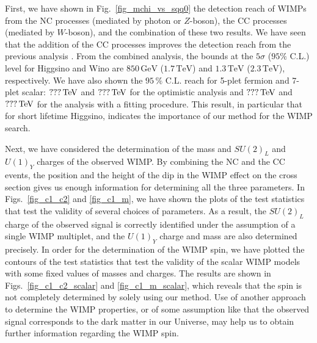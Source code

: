 \documentclass[12pt,twoside,book]{article}
\begin{document}
First, we have shown in Fig.~\ref{fig_mchi_vs_sqq0} the detection reach of WIMPs from the NC processes (mediated by photon or $Z$-boson), the CC processes (mediated by $W$-boson), and the combination of these two results.
We have seen that the addition of the CC processes improves the detection reach from the previous analysis \cite{Chigusa:2018vxz}.
From the combined analysis, the bounds at the $5\sigma$ ($95\%$ C.L.) level for Higgsino and Wino are $850\,\mathrm{GeV}$ ($1.7\,\mathrm{TeV}$) and $1.3\,\mathrm{TeV}$ ($2.3\,\mathrm{TeV}$), respectively.
We have also shown the $95\,\%$ C.L. reach for 5-plet fermion and 7-plet scalar: $???\,{\rm TeV}$ and $???\,{\rm TeV}$ for the optimistic analysis and $???\,{\rm TeV}$ and $???\,{\rm TeV}$ for the analysis with a fitting procedure.
This result, in particular that for short lifetime Higgsino, indicates the importance of our method for the WIMP search.

Next, we have considered the determination of the mass and $SU(2)_L$ and $U(1)_Y$ charges of the observed WIMP.
By combining the NC and the CC events, the position and the height of the dip in the WIMP effect on the cross section gives us enough information for determining all the three parameters.
In Figs.~\ref{fig_c1_c2} and \ref{fig_c1_m}, we have shown the plots of the test statistics that test the validity of several choices of parameters.
As a result, the $SU(2)_L$ charge of the observed signal is correctly identified under the assumption of a single WIMP multiplet, and the $U(1)_Y$ charge and mass are also determined precisely.
In order for the determination of the WIMP spin, we have plotted the contours of the test statistics that test the validity of the scalar WIMP models with some fixed values of masses and charges.
The results are shown in Figs.~\ref{fig_c1_c2_scalar} and \ref{fig_c1_m_scalar}, which reveals that the spin is not completely determined by solely using our method.
Use of another approach to determine the WIMP properties, or of some assumption like that the observed signal corresponds to the dark matter in our Universe, may help us to obtain further information regarding the WIMP spin.


% 
% 
\end{document}
